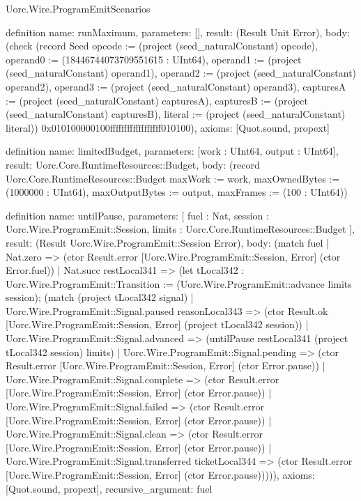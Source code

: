 \begin{lexlean}{Uorc.Wire.ProgramEmitScenarios}
\begin{semanticmodule}
definition{
  name: runMaximum,
  parameters: [],
  result: (Result Unit Error),
  body: (check (record Seed {opcode := (project (seed_naturalConstant) opcode), operand0 := (18446744073709551615 : UInt64), operand1 := (project (seed_naturalConstant) operand1), operand2 := (project (seed_naturalConstant) operand2), operand3 := (project (seed_naturalConstant) operand3), capturesA := (project (seed_naturalConstant) capturesA), capturesB := (project (seed_naturalConstant) capturesB), literal := (project (seed_naturalConstant) literal)}) 0x010100000100ffffffffffffffffff010100),
  axioms: [Quot.sound, propext]
}

definition{
  name: limitedBudget,
  parameters: [work : UInt64, output : UInt64],
  result: Uorc.Core.RuntimeResources::Budget,
  body: (record Uorc.Core.RuntimeResources::Budget {maxWork := work, maxOwnedBytes := (1000000 : UInt64), maxOutputBytes := output, maxFrames := (100 : UInt64)})
}

definition{
  name: untilPause,
  parameters: [
    fuel : Nat,
    session : Uorc.Wire.ProgramEmit::Session,
    limits : Uorc.Core.RuntimeResources::Budget
  ],
  result: (Result Uorc.Wire.ProgramEmit::Session Error),
  body: (match fuel
    | Nat.zero => (ctor Result.error [Uorc.Wire.ProgramEmit::Session, Error] (ctor Error.fuel))
    | Nat.succ restLocal341 => (let tLocal342 : Uorc.Wire.ProgramEmit::Transition := (Uorc.Wire.ProgramEmit::advance limits session); (match (project tLocal342 signal)
      | Uorc.Wire.ProgramEmit::Signal.paused reasonLocal343 => (ctor Result.ok [Uorc.Wire.ProgramEmit::Session, Error] (project tLocal342 session))
      | Uorc.Wire.ProgramEmit::Signal.advanced => (untilPause restLocal341 (project tLocal342 session) limits)
      | Uorc.Wire.ProgramEmit::Signal.pending => (ctor Result.error [Uorc.Wire.ProgramEmit::Session, Error] (ctor Error.pause))
      | Uorc.Wire.ProgramEmit::Signal.complete => (ctor Result.error [Uorc.Wire.ProgramEmit::Session, Error] (ctor Error.pause))
      | Uorc.Wire.ProgramEmit::Signal.failed => (ctor Result.error [Uorc.Wire.ProgramEmit::Session, Error] (ctor Error.pause))
      | Uorc.Wire.ProgramEmit::Signal.clean => (ctor Result.error [Uorc.Wire.ProgramEmit::Session, Error] (ctor Error.pause))
      | Uorc.Wire.ProgramEmit::Signal.transferred ticketLocal344 => (ctor Result.error [Uorc.Wire.ProgramEmit::Session, Error] (ctor Error.pause))))),
  axioms: [Quot.sound, propext],
  recursive_argument: fuel
}


\end{semanticmodule}
\end{lexlean}
